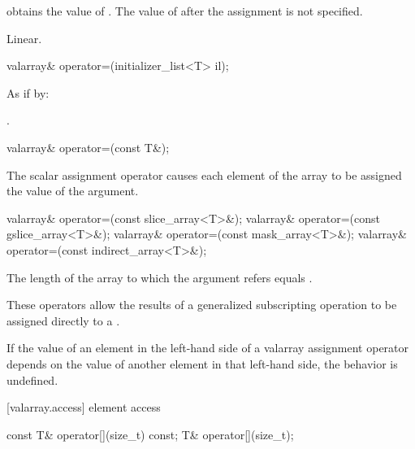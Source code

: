 \begin{itemdescr}
\pnum
\effects {} obtains the value of .
The value of  after the assignment is not specified.

\pnum
\complexity Linear.
\end{itemdescr}

%
\begin{itemdecl}
valarray& operator=(initializer_list<T> il);
\end{itemdecl}

\begin{itemdescr}
\pnum
\effects As if by: 

\pnum
\returns {}.
\end{itemdescr}


%
\begin{itemdecl}
valarray& operator=(const T&);
\end{itemdecl}

\begin{itemdescr}
\pnum
The scalar assignment operator causes each element of the
array to be assigned the value of the argument.
\end{itemdescr}

%
\begin{itemdecl}
valarray& operator=(const slice_array<T>&);
valarray& operator=(const gslice_array<T>&);
valarray& operator=(const mask_array<T>&);
valarray& operator=(const indirect_array<T>&);
\end{itemdecl}

\begin{itemdescr}
\pnum
\requires The length of the array to which the argument refers equals .

\pnum
These operators allow the results of a generalized subscripting operation
to be assigned directly to a
.

\pnum
If the value of an element in the left-hand side of a valarray assignment
operator depends on the value of another element in that left-hand side,
the behavior is undefined.
\end{itemdescr}

[valarray.access]{ element access}

%
\begin{itemdecl}
const T&  operator[](size_t) const;
T& operator[](size_t);
\end{itemdecl}

